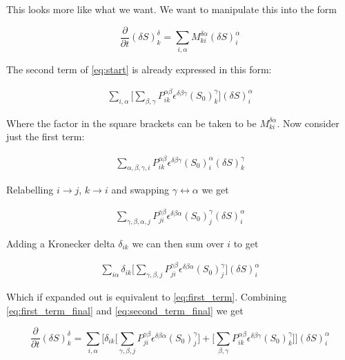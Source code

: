 \documentclass{article}
\begin{document}
This looks more like what we want. We want to manipulate this into the form

\begin{equation}
    \frac{\partial}{\partial t}(\delta S)^{\delta}_k = \sum_{i,\alpha} M_{ki}^{\delta \alpha}(\delta S)^{\alpha}_i
    \label{eq:matrixform}
\end{equation}

The second term of \eqref{eq:start} is already expressed in this form:

\begin{align}
    \sum_{i, \alpha}\big[ \sum_{\beta,\gamma}P_{ik}^{\alpha \beta}\epsilon^{\delta \beta \gamma}(S_0)_k^{\gamma}\big](\delta S)_i^{\alpha}
    \label{eq:second_term_final}
\end{align}

Where the factor in the square brackets can be taken to be $M_{ki}^{\delta\alpha}$. Now consider just the first term:

\begin{align}
    \sum_{\alpha, \beta,\gamma,i}P_{ik}^{\alpha \beta}\epsilon^{\delta \beta \gamma}(S_0)_i^{\alpha}(\delta S)^{\gamma}_k 
    \label{eq:first_term}
\end{align}

Relabelling $i \rightarrow j$, $k \rightarrow i$ and swapping $\gamma \leftrightarrow \alpha$ we get

\begin{align}
    \sum_{\gamma, \beta,\alpha,j}P_{ji}^{\gamma \beta}\epsilon^{\delta \beta \alpha}(S_0)_j^{\gamma}(\delta S)^{\alpha}_i 
\end{align}

Adding a Kronecker delta $\delta_{ik}$ we can then sum over $i$ to get 

\begin{align}
    \sum_{i\alpha}\delta_{ik}\big[\sum_{\gamma, \beta,j}P_{ji}^{\gamma \beta}\epsilon^{\delta \beta \alpha}(S_0)_j^{\gamma}\big](\delta S)^{\alpha}_i \label{eq:first_term_final}
\end{align}

Which if expanded out is equivalent to \eqref{eq:first_term}. Combining \eqref{eq:first_term_final} and \eqref{eq:second_term_final} we get 

\begin{equation}
     \frac{\partial}{\partial t}(\delta S)^{\delta}_k = \sum_{i,\alpha}\Big[\delta_{ik}\big[\sum_{\gamma, \beta,j}P_{ji}^{\gamma \beta}\epsilon^{\delta \beta \alpha}(S_0)_j^{\gamma}\big] + \big[ \sum_{\beta,\gamma}P_{ik}^{\alpha \beta}\epsilon^{\delta \beta \gamma}(S_0)_k^{\gamma}\big]\Big](\delta S)_i^{\alpha}
\end{equation}
\end{document}
